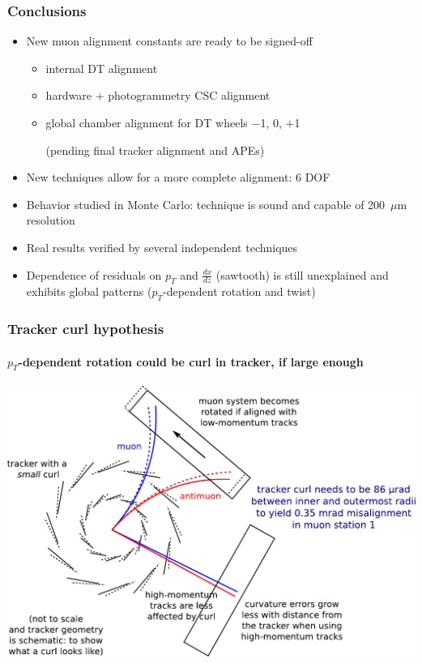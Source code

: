 \documentclass[compress]{beamer}
\begin{document}
\begin{frame}
\frametitle{Conclusions}
\begin{itemize}\setlength{\itemsep}{0.3 cm}
\item New muon alignment constants are ready to be signed-off
\begin{itemize}\setlength{\itemsep}{0.15 cm}
\item internal DT alignment
\item hardware $+$ photogrammetry CSC alignment
\item global chamber alignment for DT wheels $-$1, 0, $+$1

{\scriptsize (pending final tracker alignment and APEs)}
\end{itemize}

\item New techniques allow for a more complete alignment: 6 DOF

\item Behavior studied in Monte Carlo: technique is sound and capable of 200~$\mu$m resolution

\item Real results verified by several independent techniques

\item Dependence of residuals on $p_T$ and $\frac{dx}{dz}$ (sawtooth) is still unexplained and exhibits global patterns ($p_T$-dependent rotation and twist)
\end{itemize}
\label{numpages}
\end{frame}

\begin{frame}
\frametitle{Tracker curl hypothesis}
\framesubtitle{$p_T$-dependent rotation could be curl in tracker, if large enough}
\includegraphics[width=\linewidth]{curl_explanation.pdf}
\end{frame}
\end{document}
